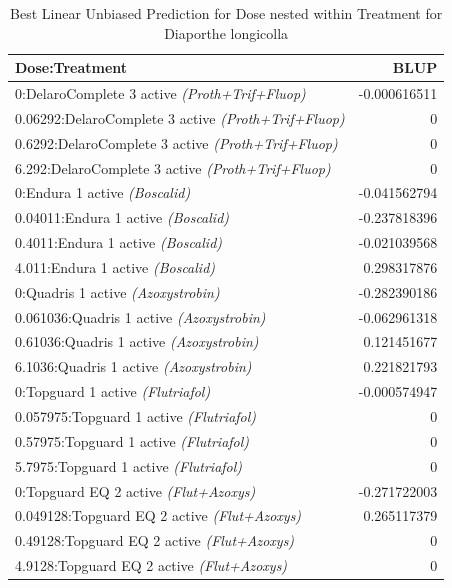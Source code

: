\documentclass[
  10pt,
  letterpaper,
  twocolumn]{article}
\begin{document}
\begin{table}[ht]
\centering
\small
\caption{Best Linear Unbiased Prediction for Dose nested within Treatment for Diaporthe longicolla }
\renewcommand{\arraystretch}{1.2}
\begin{tabular}{|p{6.4cm}|r|}
\hline
\textbf{Dose:Treatment} & \textbf{BLUP} \\
\hline
0:DelaroComplete 3 active \textit{(Proth+Trif+Fluop)} & -0.000616511 \\
0.06292:DelaroComplete 3 active \textit{(Proth+Trif+Fluop)} & 0 \\
0.6292:DelaroComplete 3 active \textit{(Proth+Trif+Fluop)} & 0 \\
6.292:DelaroComplete 3 active \textit{(Proth+Trif+Fluop)} & 0 \\
0:Endura 1 active \textit{(Boscalid)} & -0.041562794 \\
0.04011:Endura 1 active \textit{(Boscalid)} & -0.237818396 \\
0.4011:Endura 1 active \textit{(Boscalid)} & -0.021039568 \\
4.011:Endura 1 active \textit{(Boscalid)} & 0.298317876 \\
0:Quadris 1 active \textit{(Azoxystrobin)} & -0.282390186 \\
0.061036:Quadris 1 active \textit{(Azoxystrobin)} & -0.062961318 \\
0.61036:Quadris 1 active \textit{(Azoxystrobin)} & 0.121451677 \\
6.1036:Quadris 1 active \textit{(Azoxystrobin)} & 0.221821793 \\
0:Topguard 1 active \textit{(Flutriafol)} & -0.000574947 \\
0.057975:Topguard 1 active \textit{(Flutriafol)} & 0 \\
0.57975:Topguard 1 active \textit{(Flutriafol)} & 0 \\
5.7975:Topguard 1 active \textit{(Flutriafol)} & 0 \\
0:Topguard EQ 2 active \textit{(Flut+Azoxys)} & -0.271722003 \\
0.049128:Topguard EQ 2 active \textit{(Flut+Azoxys)} & 0.265117379 \\
0.49128:Topguard EQ 2 active \textit{(Flut+Azoxys)} & 0 \\
4.9128:Topguard EQ 2 active \textit{(Flut+Azoxys)} & 0 \\
\hline
\end{tabular}
\end{table}

\vspace{0.1cm}
\end{document}
